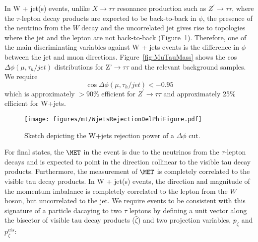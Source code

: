 In W + jet(s) events, unlike $X\rightarrow\tau\tau$ resonance production such as $Z^{\prime} \to \tau\tau$, where the $\tau$-lepton decay products are expected to 
be back-to-back in $\phi$, the presence of the neutrino from the $W$ decay and the uncorrelated jet gives rise to topologies where the jet and the lepton are not 
back-to-back (Figure~\ref{fig:WjetsRejectionDelPhiFigure}). Therefore, one of the main 
discriminating variables against W + jets events is the difference in $\phi$ between the jet and muon directions. 
Figure~\ref{fig:MuTauMass} shows the cos$\Delta \phi(\mu,\tau_{h}/jet)$ distributions for Z'$\to\tau\tau$ and the relevant background samples. 
We require 
\begin{equation}
\cos\Delta\phi(\mu,\tau_{h}/jet) < -0.95
\end{equation}
\noindent which is approximately $> 90$\% efficient for $Z^{\prime} \to \tau\tau$ and approximately 25\% efficient for W+jets.

\begin{figure}
\begin{center}
\texttt{[image: figures/mt/WjetsRejectionDelPhiFigure.pdf]}
\caption{ Sketch depicting the W+jets rejection power of a $\Delta \phi$ cut.}
\label{fig:WjetsRejectionDelPhiFigure}
\end{center}
\end{figure}

For \ditau final states, the $\MET$ in the event is due to the neutrinos from the $\tau$-lepton decays and is expected to point in the direction collinear 
to the visible tau decay products. Furthermore, the measurement of $\MET$ is completely correlated to the visible tau decay products. In W + jet(s) 
events, the direction and magnitude of the momentum imbalance is completely correlated to the lepton from the $W$ boson, but 
uncorrelated to the jet. We require events to be consistent with this signature of a particle dacaying to two $\tau$ leptons by defining a unit vector along the 
bisector of visible tau decay products ($\hat{\zeta}$) and two projection variables, $p_{\zeta}$ and $p_{\zeta}^{vis}$:

